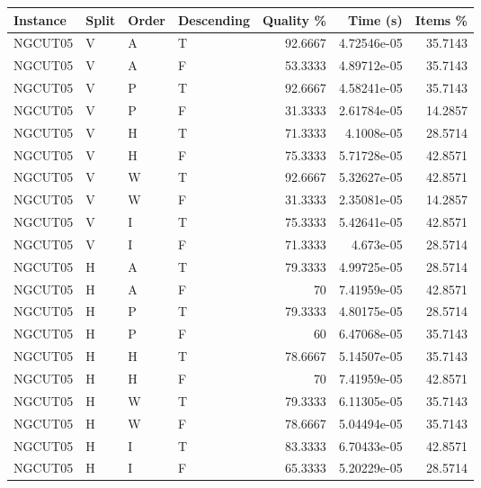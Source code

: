 \begin{tabular}{llllrrr}
    \hline
    Instance & Split & Order & Descending & Quality \% & Time (s)    & Items \% \\
    \hline
    NGCUT05  & V     & A     & T          & 92.6667    & 4.72546e-05 & 35.7143  \\
    NGCUT05  & V     & A     & F          & 53.3333    & 4.89712e-05 & 35.7143  \\
    NGCUT05  & V     & P     & T          & 92.6667    & 4.58241e-05 & 35.7143  \\
    NGCUT05  & V     & P     & F          & 31.3333    & 2.61784e-05 & 14.2857  \\
    NGCUT05  & V     & H     & T          & 71.3333    & 4.1008e-05  & 28.5714  \\
    NGCUT05  & V     & H     & F          & 75.3333    & 5.71728e-05 & 42.8571  \\
    NGCUT05  & V     & W     & T          & 92.6667    & 5.32627e-05 & 42.8571  \\
    NGCUT05  & V     & W     & F          & 31.3333    & 2.35081e-05 & 14.2857  \\
    NGCUT05  & V     & I     & T          & 75.3333    & 5.42641e-05 & 42.8571  \\
    NGCUT05  & V     & I     & F          & 71.3333    & 4.673e-05   & 28.5714  \\
    NGCUT05  & H     & A     & T          & 79.3333    & 4.99725e-05 & 28.5714  \\
    NGCUT05  & H     & A     & F          & 70         & 7.41959e-05 & 42.8571  \\
    NGCUT05  & H     & P     & T          & 79.3333    & 4.80175e-05 & 28.5714  \\
    NGCUT05  & H     & P     & F          & 60         & 6.47068e-05 & 35.7143  \\
    NGCUT05  & H     & H     & T          & 78.6667    & 5.14507e-05 & 35.7143  \\
    NGCUT05  & H     & H     & F          & 70         & 7.41959e-05 & 42.8571  \\
    NGCUT05  & H     & W     & T          & 79.3333    & 6.11305e-05 & 35.7143  \\
    NGCUT05  & H     & W     & F          & 78.6667    & 5.04494e-05 & 35.7143  \\
    NGCUT05  & H     & I     & T          & 83.3333    & 6.70433e-05 & 42.8571  \\
    NGCUT05  & H     & I     & F          & 65.3333    & 5.20229e-05 & 28.5714  \\

\end{tabular}
